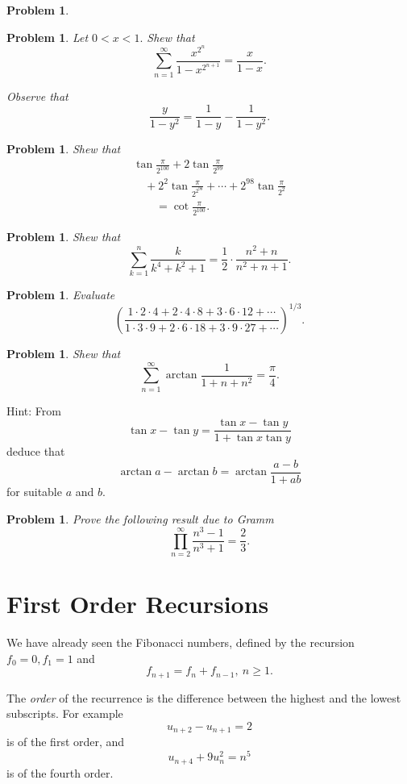 \documentclass[11pt, openany]{book}
\theoremstyle{change} \theoremheaderfont{\blue\sffamily\bfseries}
\newtheorem{pro}[thm]{Problem}
\theoremstyle{nonumberplain} \theoremheaderfont{\sffamily\bfseries}
\newcommand{\í}{\'{\i}}
\begin{document}
\begin{multicols}{2}
\begin{pro}
\begin{answer}
\end{answer}
\end{pro}
\begin{pro} Let $0 < x < 1.$ Shew that
$$\sum _{n= 1} ^\infty \frac{x^{2^n}}{1 - x^{2^{n + 1}}} = \frac{x}{1 - x}.$$
\begin{answer}
Observe that
$$ \frac{y}{1 - y^2} = \frac{1}{1 - y} - \frac{1}{1 - y^2}.
$$
\end{answer}
\end{pro}
\begin{pro} Shew that
$$\begin{array}{l}\tan \frac{\pi}{2^{100}} + 2\tan \frac{\pi}{2^{99}} \\ \quad + 2^{2}\tan \frac{\pi}{2^{2^{98}}} +
\cdots + 2^{98}\tan \frac{\pi}{2^2}\\ \qquad = \cot
\frac{\pi}{2^{100}}.\end{array}$$
\end{pro}
\begin{pro} Shew that
$$\sum _{k = 1} ^n \frac{k}{k^4 + k^2 + 1} = \frac{1}{2}\cdot\frac{n^2 + n}{n^2 + n + 1}.$$
\end{pro}
\begin{pro} Evaluate
$$\left(\frac{1\cdot 2\cdot 4 + 2 \cdot 4\cdot 8 + 3\cdot 6\cdot 12 + \cdots}{
1\cdot 3 \cdot 9 + 2\cdot 6\cdot 18 + 3\cdot 9\cdot 27 +
\cdots}\right) ^{1/3}.$$
\end{pro}
\begin{pro} Shew that $$\sum _{n = 1} ^\infty \arctan \frac{1}{1 + n + n^2} = \frac{\pi}{4}.$$
\end{pro}
Hint: From $$\tan x - \tan y = \frac{\tan x - \tan y}{1 + \tan
x\tan y}$$deduce that $$\arctan a - \arctan b = \arctan \frac{a -
b}{1 + ab}$$for suitable $a$ and $b$.
\begin{pro} Prove the following result due to Gramm
$$ \prod _{n = 2} ^\infty \frac{n^3 - 1}{n^3 + 1} = \frac{2}{3}.$$
\end{pro}
\end{multicols}
\section{First Order Recursions} We have already
seen the Fibonacci numbers, defined by the recursion $f_0 = 0, f_1
= 1$ and
$$f_{n + 1} = f_n + f_{n - 1}, \ n \geq 1.$$



The {\em order} of the recurrence is  the difference between the
highest and the lowest subscripts. For example
$$u_{n + 2} - u_{n + 1} = 2$$ is of the first order, and
$$u_{n + 4} + 9u^2 _n = n^5$$is of the fourth order.
\end{document}
